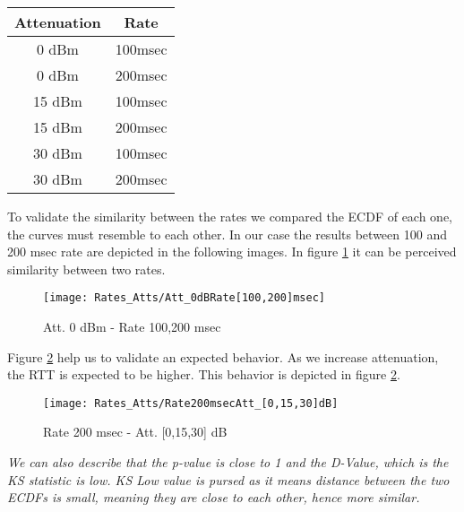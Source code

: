 \begin{center}
	\begin{tabular}{||c c||}
		\hline
		Attenuation & Rate\\ [0.5ex] 
		\hline\hline
		0 dBm & 100msec\\ 
		\hline
		0 dBm & 200msec\\
		\hline
		15 dBm & 100msec\\
		\hline
		15 dBm & 200msec\\
		\hline
		30 dBm & 100msec\\
		\hline
		30 dBm & 200msec\\ [1ex] 
		\hline
	\end{tabular}
\end{center}

To validate the similarity between the rates we compared the ECDF of each one, the curves must resemble to each other. In our case the results between 100 and 200 msec rate are depicted in the following images. In figure \ref{att_0_100and200msec} it can be perceived similarity between two rates.

\begin{figure}[h]
	\centering
	\texttt{[image: Rates\_Atts/Att\_0dBRate[100,200]msec]}
	\caption{Att. 0 dBm - Rate 100,200 msec}
	\label{att_0_100and200msec}
\end{figure}

Figure \ref{rate_200msec_Att_0_15_30dBm} help us to validate an expected behavior. As we increase attenuation, the RTT is expected to be higher. This behavior is depicted in figure \ref{rate_200msec_Att_0_15_30dBm}.

\begin{figure}[h]
	\centering
	\texttt{[image: Rates\_Atts/Rate200msecAtt\_[0,15,30]dB]}
	\caption{Rate 200 msec - Att. [0,15,30] dB}
	\label{rate_200msec_Att_0_15_30dBm}
\end{figure}

\emph{We can also describe that the p-value is close to 1 and the D-Value, which is the KS statistic is low. KS Low value is pursed as it means distance between the two ECDFs is small, meaning they are close to each other, hence more similar.}